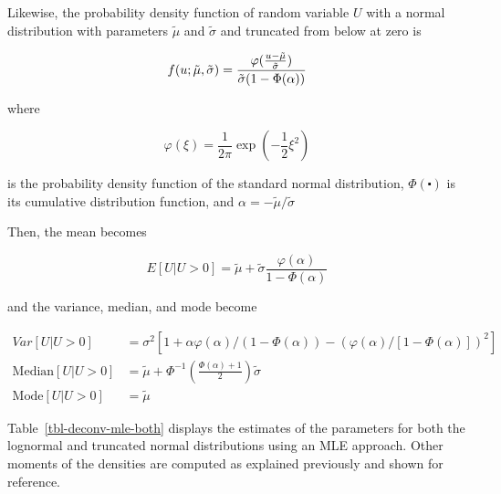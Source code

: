 \documentclass[
  12pt]{article}
\theoremstyle{definition}
\theoremstyle{remark}
\begin{document}
Likewise, the probability density function of random variable \(U\) with
a normal distribution with parameters \(\tilde\mu\) and \(\tilde\sigma\)
and truncated from below at zero is

\[
  f(u\\;\tilde\mu,\tilde\sigma) = \frac{\varphi(\frac{u-\tilde\mu}{\tilde\sigma})}{\tilde\sigma (1-\Phi(\alpha))}
\]

where

\[
\varphi(\xi)=\frac{1}{2\pi}\exp(-\frac{1}{2}\xi^2)
\]

is the probability density function of the standard normal distribution,
\(\Phi(\centerdot)\) is its cumulative distribution function, and
\(\alpha=-\tilde\mu/\tilde\sigma\)

Then, the mean becomes

\[
E[U|U>0]=\tilde\mu+\tilde\sigma\frac{\varphi(\alpha)}{1-\Phi(\alpha)}
\]

and the variance, median, and mode become

\[
\begin{aligned}  
Var[U|U>0]&=\sigma^2[1+\alpha\varphi(\alpha)/(1-\Phi(\alpha))-(\varphi(\alpha)/[1-\Phi(\alpha)])^2]\\
\text{Median}[U|U>0]&=\tilde\mu+\Phi^{-1}\left(\frac{\Phi(\alpha)+1}{2}\right)\tilde\sigma \\ 
\text{Mode}[U|U>0]&=\tilde\mu
\end{aligned}
\]

Table~\ref{tbl-deconv-mle-both} displays the estimates of the parameters
for both the lognormal and truncated normal distributions using an MLE
approach. Other moments of the densities are computed as explained
previously and shown for reference.
\end{document}
